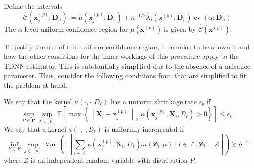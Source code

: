 \documentclass[letterpaper,10pt]{article}
\numberwithin{equation}{section}
\numberwithin{theorem}{section}
\theoremstyle{definition}
\renewcommand{\hat}{\widehat}
\newcommand{\1}{\mathbb{1}}
\begin{document}
\vspace{0.5cm}
\begin{theorem}
	Define the intervals
	\begin{equation}
		\hat{\mathcal{C}}\left(\mathbf{x}^{(p)}_j; \mathbf{D}_n\right)
		:= \hat{\mu}\left(\mathbf{x}^{(p)}_{j}; \mathbf{D}_n\right) \pm
		n^{-1/2} \hat{\lambda}_{j}\left(\mathbf{x}^{(p)}; \mathbf{D}_n\right)\operatorname{cv}\left(\alpha; \mathbf{D}_n\right)
	\end{equation}
	The $\alpha$-level uniform confidence region for $\mu\left(\mathbf{x}^{(p)}\right)$ is given by $\hat{\mathcal{C}}\left(\mathbf{x}^{(p)}\right)$.
\end{theorem}

To justify the use of this uniform confidence region, it remains to be shown if and how the other conditions for the inner workings of this procedure apply to the TDNN estimator.
This is substantially simplified due to the absence of a nuisance parameter.
Thus, consider the following conditions from \cite{ritzwoller_uniform_2024} that are simplified to fit the problem at hand.

\vspace{0.5cm}
\begin{definition}
	We say that the kernel $\kappa\left(\cdot, \cdot, D_{\ell}\right)$ has a uniform shrinkage rate $\epsilon_b$ if
	\begin{equation}
		\sup_{P \in \mathbf{P}} \sup_{j \in[p]}
		\mathbb{E}\left[\max \left\{\left\|\mathbf{X}_i-\mathbf{x}^{(p)}_{j}\right\|_{2}: \kappa\left(\mathbf{x}^{(p)}_{j}, \mathbf{X}_i, D_{\ell}\right)>0\right\}\right]
		\leq \epsilon_b .
	\end{equation}
	We say that a kernel $\kappa\left(\cdot, \cdot, D_{\ell}\right)$ is uniformly incremental if
	\begin{equation}
		\inf_{P \in \mathbf{P}} \sup_{j \in[p]}
		\operatorname{Var}\left(\mathbb{E}\left[\sum_{i \in \ell} \kappa\left(\mathbf{x}^{(p)}_{j}, \mathbf{X}_i, D_{\ell}\right) m\left(\mathbf{Z}_i ; \mu\right) \mid l \in \ell, \mathbf{Z}_l = Z\right]\right)
		\gtrsim b^{-1}
	\end{equation}
	where $Z$ is an independent random variable with distribution $P$.
\end{definition}
\end{document}
